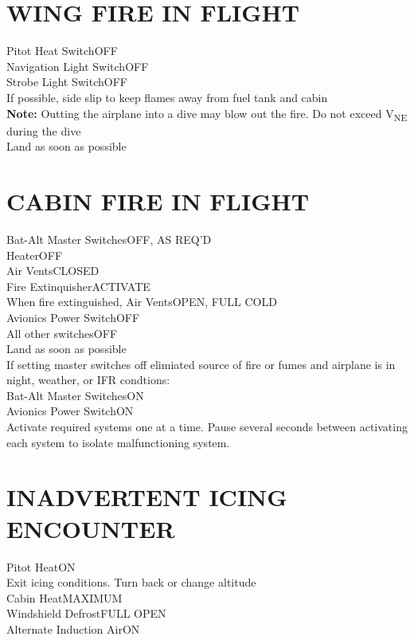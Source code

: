 \documentclass{article}
\begin{document}
\begin{multicols*}{2}
\section*{WING FIRE IN FLIGHT}
Pitot Heat Switch\dotfill OFF\\
Navigation Light Switch\dotfill OFF\\
Strobe Light Switch\dotfill OFF\\
If possible, side slip to keep flames away from fuel tank and cabin\\
\textbf{Note:} Outting the airplane into a dive may blow out the fire. Do not exceed V\textsubscript{NE} during the dive\\
Land as soon as possible
\vfill\null
\section*{CABIN FIRE IN FLIGHT}
Bat-Alt Master Switches\dotfill OFF, AS REQ'D\\
Heater\dotfill OFF\\
Air Vents\dotfill CLOSED\\
Fire Extinquisher\dotfill ACTIVATE\\
When fire extinguished, Air Vents\dotfill OPEN, FULL COLD\\
Avionics Power Switch\dotfill OFF\\
All other switches\dotfill OFF\\
Land as soon as possible\\
If setting master switches off elimiated source of fire or fumes and airplane is in night, weather, or IFR condtions:\\
\hspace*{6mm} Bat-Alt Master Switches\dotfill ON\\
\hspace*{6mm} Avionics Power Switch\dotfill ON\\
\hspace*{6mm} Activate required systems one at a time. Pause several seconds between activating each system to isolate malfunctioning system.
\section*{INADVERTENT ICING ENCOUNTER}
Pitot Heat\dotfill ON\\
Exit icing conditions. Turn back or change altitude\\
Cabin Heat\dotfill MAXIMUM\\
Windshield Defrost\dotfill FULL OPEN\\
Alternate Induction Air\dotfill ON

\end{multicols*}
\end{document}
